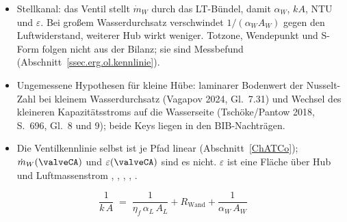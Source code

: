 \begin{itemize}
    keine brennstoffspezifische Größe. Ein gemeinsamer Proxy für Gas und
    Diesel ist bei gleichem Luftpfad und vergleichbaren Stoffeigenschaften
    begründbar; gleiche Modellkoeffizienten oder gleiche Güte folgen
    daraus nicht. Reynolds-Abhängigkeit des Verlustbeiwerts,
    Kondensation, Verschmutzung und Änderungen der Strömungsaufteilung
    begrenzen die Näherung. Ein aus der Motorfüllung abgeleiteter
    Massenstrom ist bei Abzweigungen oder Speicherwirkung nicht ohne
    Bilanzprüfung dem Kühlerdurchsatz gleichzusetzen.
    Die gemessene Druckdifferenz muss den betrachteten Kühlerpfad erfassen.
    Konkrete Messkanäle, Druckabgriffe und Druckrekonstruktion:
    Kapitel~\ref{ch.datenbasis} und \ref{ch.methodik}. Vergleich von
    $\mrel$ und $q_{\mathrm{rel}}$ hinsichtlich Vorhersagefehler und
    Ventilwirkung: Kapitel~\ref{ch.ergebnisse}; daraus allein folgt kein
    Nachweis der Genauigkeit gegenüber dem tatsächlichen Luftmassenstrom.
  \item Stellkanal: das Ventil stellt $\dot m_W$ durch das LT-Bündel, damit
    $\alpha_W$, $kA$, NTU und $\varepsilon$. Bei großem Wasserdurchsatz
    verschwindet $1/(\alpha_W A_W)$ gegen den Luftwiderstand, weiterer Hub wirkt
    weniger. Totzone, Wendepunkt und S-Form folgen nicht aus der Bilanz; sie
    sind Messbefund (Abschnitt~\ref{ssec.erg.ol.kennlinie}).
  \item Ungemessene Hypothesen für kleine Hübe: laminarer Bodenwert der
    Nusselt-Zahl bei kleinem Wasserdurchsatz (Vagapov 2024, Gl.~7.31) und
    Wechsel des kleineren Kapazitätsstroms auf die Wasserseite (Tschöke/Pantow
    2018, S.~696, Gl.~8 und 9); beide Keys liegen in den BIB-Nachträgen.
  \item Die Ventilkennlinie selbst ist je Pfad linear (Abschnitt~\ref{ChATCo});
    $\dot m_W(\valveCA)$ und $\varepsilon(\valveCA)$ sind es nicht.
    $\varepsilon$ ist eine Fläche über Hub und Luftmassenstrom
    \cite[S.~205, Gl.~7.70 und 7.71]{erikssonModelingControlEngines2014},
    \cite[S.~132]{erikssonMODELINGTURBOCHARGEDSI},
    \cite[S.~11, Gl.~2.16]{petterssonSimulationTurboCharged2000},
    \cite[Gl.~B.8]{suiMeanValueFirst2022},
    \cite[S.~89]{rupprechtAnalysisSimulationOptimisation2016}.
\end{itemize}

\begin{equation}
  \label{eq.k.zusammensetzung}
  \frac{1}{k\,A} \;=\; \frac{1}{\eta_f\,\alpha_L\,A_L}
  + R_{\mathrm{Wand}}
  + \frac{1}{\alpha_W\,A_W}
\end{equation}

